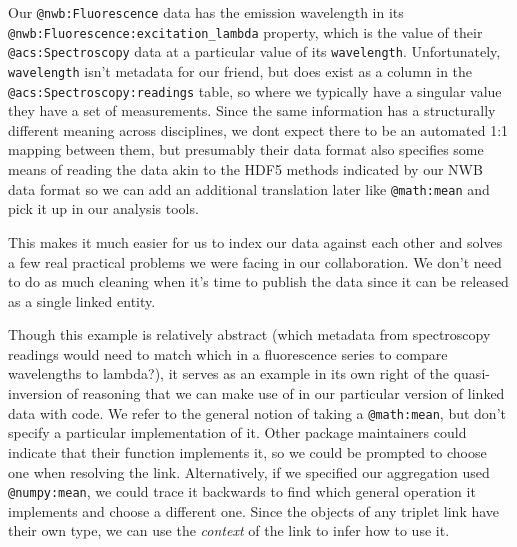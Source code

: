 Our \texttt{@nwb:Fluorescence} data has the emission wavelength in its
\texttt{@nwb:Fluorescence:excitation\_lambda} property, which is the value of their
\texttt{@acs:Spectroscopy} data at a particular value of its
\texttt{wavelength}. Unfortunately, \texttt{wavelength} isn't metadata
for our friend, but does exist as a column in the
\texttt{@acs:Spectroscopy:readings} table, so where we typically have a
singular value they have a set of measurements. Since the same
information has a structurally different meaning across disciplines, we
dont expect there to be an automated 1:1 mapping between them, but
presumably their data format also specifies some means of reading the
data akin to the HDF5 methods indicated by our NWB data format so we can
add an additional translation later like \texttt{@math:mean} and pick it
up in our analysis tools.

\begin{Shaded}
\begin{Highlighting}[]
\end{Highlighting}
\end{Shaded}

This makes it much easier for us to index our data against each other
and solves a few real practical problems we were facing in our
collaboration. We don't need to do as much cleaning when it's time to
publish the data since it can be released as a single linked entity.

Though this example is relatively abstract (which metadata from
spectroscopy readings would need to match which in a fluorescence series
to compare wavelengths to lambda?), it serves as an example in its own
right of the quasi-inversion of reasoning that we can make use of in our
particular version of linked data with code. We refer to the general
notion of taking a \texttt{@math:mean}, but don't specify a particular
implementation of it. Other package maintainers could indicate that
their function implements it, so we could be prompted to choose one when
resolving the link. Alternatively, if we specified our aggregation used
\texttt{@numpy:mean}, we could trace it backwards to find which general
operation it implements and choose a different one. Since the objects of
any triplet link have their own type, we can use the \emph{context} of
the link to infer how to use it.

